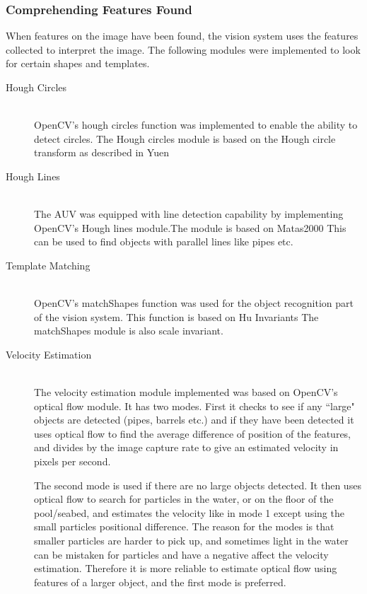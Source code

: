\subsubsection{Comprehending Features Found} 
When features on the image have been found, the vision system uses the features collected to interpret the image. The following modules were implemented to look for certain shapes and templates.
\begin{description}
\item[Hough Circles]\hfill \\
OpenCV's hough circles function was implemented to enable the ability to detect circles. The Hough circles module is based on the Hough circle transform as described in Yuen \cite{article:yuen} 

\item[Hough Lines]\hfill \\
The AUV was equipped with line detection capability by implementing OpenCV's Hough lines module.The module is based on Matas2000 \cite{article:matas} This can be used to find objects with parallel lines like pipes etc.

\item[Template Matching]\hfill \\
OpenCV's matchShapes function was used for the object recognition part of the vision system. This function is based on Hu Invariants \cite{article:hu} The matchShapes module is also scale invariant.

\item[Velocity Estimation]\hfill \\
The velocity estimation module implemented was based on OpenCV's optical flow module. It has two modes. First it checks to see if any ``large" objects are detected (pipes, barrels etc.) and if they have been detected it uses optical flow to find the average difference of position of the features, and divides by the image capture rate to give an estimated velocity in pixels per second.
 
The second mode is used if there are no large objects detected. It then uses optical flow to search for particles in the water, or on the floor of the pool/seabed, and estimates the velocity like in mode 1 except using the small particles positional difference. The reason for the modes is that smaller particles are harder to pick up, and sometimes light in the water can be mistaken for particles and have a negative affect the velocity estimation. Therefore it is more reliable to estimate optical flow using features of a larger object, and the first mode is preferred.
\end{description}

